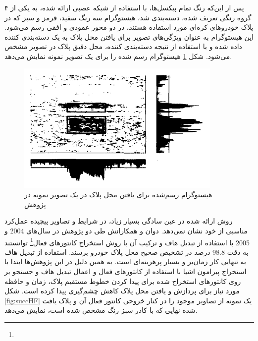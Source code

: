 \documentclass[12pt,a4paper]{article}
\newcommand{\enfootnote}[1]{\footnote{\lr{#1}}}
\begin{document}
پس از این‌که رنگ تمام پیکسل‌ها، با استفاده از شبکه عصبی ارائه شده، به یکی از ۴ گروه رنگی تعریف شده، دسته‌بندی شد، هیستوگرام سه رنگ سفید، قرمز و سبز که در پلاک خودروهای کره‌ای مورد استفاده هستند، در دو محور عمودی و افقی رسم می‌شود. این هیستوگرام به عنوان ويژگی‌های تصویر برای یافتن محل پلاک به یک دسته‌بندی کننده داده شده و با استفاده از نتیجه دسته‌بندی کننده، محل دقیق پلاک در تصویر مشخص می‌شود. شکل \ref{fig:hist1} هیستوگرام رسم شده را برای یک تصویر نمونه نمایش می‌دهد.

\begin{figure}[h]
\centering
\includegraphics[scale=0.4]{Imgs/hist1.png}
\caption{هیستوگرام رسم‌شده برای یافتن محل پلاک در یک تصویر نمونه در پژوهش \cite{lee1994automatic}}
\label{fig:hist1}
\end{figure}



روش ارائه شده در عین سادگی بسیار زیاد، در شرایط و تصاویر پیچیده عمل‌کرد مناسبی از خود نشان نمی‌دهد. دوان و همکارانش طی دو پژوهش در سال‌های 2004 \cite{duan2004combining} و 2005 \cite{duan2005building} با استفاده از تبدیل هاف و ترکیب آن با روش استخراج کانتورهای فعال\enfootnote{Active Contours} توانستند به دقت 98.8 درصد در تشخیص صحیح محل پلاک خودرو برسند. استفاده از تبدیل هاف به تنهایی کار زمان‌بر و بسیار پرهزینه‌ای است. به همین دلیل در این پژوهش‌ها ابتدا با استخراج پیرامون اشیا با استفاده از کانتورهای فعال و اعمال تبدیل هاف و جستجو بر روی کانتورهای استخراج شده برای پیدا کردن خطوط مستقیم پلاک، زمان و حافظه مورد نیاز برای پردازش و یافتن محل پلاک کاهش چشم‌گیری پیدا کرده است.  شکل \ref{fig:succHF} یک نمونه از تصاویر موجود را در کنار خروجی کانتور فعال آن و  پلاک یافت شده نهایی که با کادر سبز رنگ مشخص شده است، نمایش می‌دهد.
\end{document}
